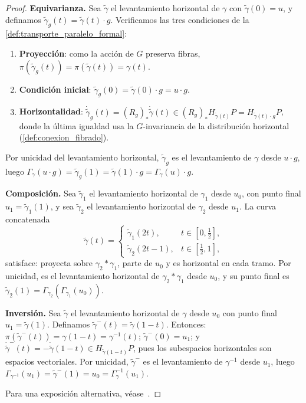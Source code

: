 \begin{proof}
\textbf{Equivarianza.} Sea $\tilde{\gamma}$ el levantamiento horizontal de $\gamma$ con $\tilde{\gamma}(0) = u$, y definamos $\tilde{\gamma}_g(t) = \tilde{\gamma}(t) \cdot g$. Verificamos las tres condiciones de la \autoref{def:transporte_paralelo_formal}:
\begin{enumerate}
    \item \textbf{Proyección}: como la acción de $G$ preserva fibras, $\pi(\tilde{\gamma}_g(t)) = \pi(\tilde{\gamma}(t)) = \gamma(t)$.
    \item \textbf{Condición inicial}: $\tilde{\gamma}_g(0) = \tilde{\gamma}(0) \cdot g = u \cdot g$.
    \item \textbf{Horizontalidad}: $\dot{\tilde{\gamma}}_g(t) = (R_g)_* \dot{\tilde{\gamma}}(t) \in (R_g)_* H_{\tilde{\gamma}(t)} P = H_{\tilde{\gamma}(t) \cdot g} P$, donde la última igualdad usa la $G$-invariancia de la distribución horizontal (\autoref{def:conexion_fibrado}).
\end{enumerate}
Por unicidad del levantamiento horizontal, $\tilde{\gamma}_g$ es el levantamiento de $\gamma$ desde $u \cdot g$, luego $\Gamma_\gamma(u \cdot g) = \tilde{\gamma}_g(1) = \tilde{\gamma}(1) \cdot g = \Gamma_\gamma(u) \cdot g$.

\textbf{Composición.} Sea $\tilde{\gamma}_1$ el levantamiento horizontal de $\gamma_1$ desde $u_0$, con punto final $u_1 = \tilde{\gamma}_1(1)$, y sea $\tilde{\gamma}_2$ el levantamiento horizontal de $\gamma_2$ desde $u_1$. La curva concatenada
\[
\tilde{\gamma}(t) = \begin{cases} \tilde{\gamma}_1(2t), & t \in [0, \tfrac{1}{2}], \\ \tilde{\gamma}_2(2t - 1), & t \in [\tfrac{1}{2}, 1], \end{cases}
\]
satisface: proyecta sobre $\gamma_2 * \gamma_1$, parte de $u_0$ y es horizontal en cada tramo. Por unicidad, es el levantamiento horizontal de $\gamma_2 * \gamma_1$ desde $u_0$, y su punto final es $\tilde{\gamma}_2(1) = \Gamma_{\gamma_2}(\Gamma_{\gamma_1}(u_0))$.

\textbf{Inversión.} Sea $\tilde{\gamma}$ el levantamiento horizontal de $\gamma$ desde $u_0$ con punto final $u_1 = \tilde{\gamma}(1)$. Definamos $\tilde{\gamma}^{-}(t) = \tilde{\gamma}(1-t)$. Entonces: $\pi(\tilde{\gamma}^{-}(t)) = \gamma(1-t) = \gamma^{-1}(t)$; $\tilde{\gamma}^{-}(0) = u_1$; y $\dot{\tilde{\gamma}}^{-}(t) = -\dot{\tilde{\gamma}}(1-t) \in H_{\tilde{\gamma}(1-t)}P$, pues los subespacios horizontales son espacios vectoriales. Por unicidad, $\tilde{\gamma}^{-}$ es el levantamiento de $\gamma^{-1}$ desde $u_1$, luego $\Gamma_{\gamma^{-1}}(u_1) = \tilde{\gamma}^{-}(1) = u_0 = \Gamma_\gamma^{-1}(u_1)$.

Para una exposición alternativa, véase~\citep[Cap.~II, Prop.~3.2]{Kobayashi1996}.
\end{proof}

